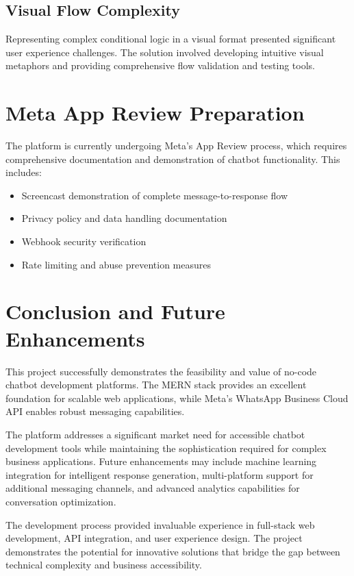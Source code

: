 \documentclass[conference]{IEEEtran}
\begin{document}
\subsection{Visual Flow Complexity}

Representing complex conditional logic in a visual format presented significant user experience challenges. The solution involved developing intuitive visual metaphors and providing comprehensive flow validation and testing tools.

\section{Meta App Review Preparation}

The platform is currently undergoing Meta's App Review process, which requires comprehensive documentation and demonstration of chatbot functionality. This includes:

\begin{itemize}
\item Screencast demonstration of complete message-to-response flow
\item Privacy policy and data handling documentation
\item Webhook security verification
\item Rate limiting and abuse prevention measures
\end{itemize}

\section{Conclusion and Future Enhancements}

This project successfully demonstrates the feasibility and value of no-code chatbot development platforms. The MERN stack provides an excellent foundation for scalable web applications, while Meta's WhatsApp Business Cloud API enables robust messaging capabilities.

The platform addresses a significant market need for accessible chatbot development tools while maintaining the sophistication required for complex business applications. Future enhancements may include machine learning integration for intelligent response generation, multi-platform support for additional messaging channels, and advanced analytics capabilities for conversation optimization.

The development process provided invaluable experience in full-stack web development, API integration, and user experience design. The project demonstrates the potential for innovative solutions that bridge the gap between technical complexity and business accessibility.
\end{document}
